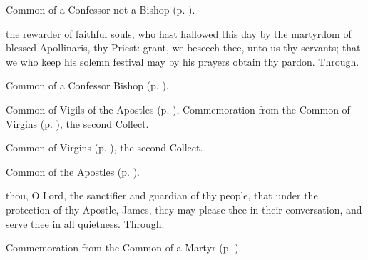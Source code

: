 \clearpage
{}

\begin{rubric}
	Common of a Confessor not a Bishop (p. \pageref{AbbotCollect}).
\end{rubric}



\memorialCollect
{} the rewarder of faithful souls, who hast hallowed this day by the martyrdom of blessed Apollinaris, thy Priest: grant, we beseech thee, unto us thy servants; that we who keep his solemn festival may by his prayers obtain thy pardon. Through.



\begin{rubric}
	Common of a Confessor Bishop (p. \pageref{ConfessorBishopCollect}).
\end{rubric}



\begin{rubric}
	Common of Vigils of the Apostles (p. \pageref{CommonVigilApostles}), Commemoration  from the Common of Virgins (p. \pageref{CommonVirgin}), the second Collect.
\end{rubric}



\begin{rubric}
	Common of Virgins (p. \pageref{VirginMartyressCollect}), the second Collect.
\end{rubric}



\begin{rubric}
	Common of the Apostles (p. \pageref{CommonApostles}).
\end{rubric}

{} thou, O Lord, the sanctifier and guardian of thy people, that under the protection of thy Apostle, James, they may please thee in their conversation, and serve thee in all quietness. Through.
\begin{rubric}
	 Commemoration  from the Common of a Martyr (p. \pageref{CommonMartyrNotBishopCollect}).
\end{rubric}


